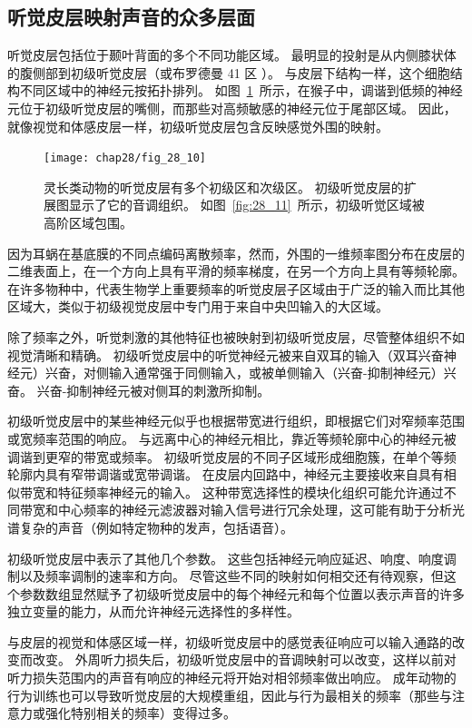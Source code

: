 \subsection{听觉皮层映射声音的众多层面}

听觉皮层包括位于颞叶背面的多个不同功能区域。
最明显的投射是从内侧膝状体的腹侧部到初级听觉皮层（或布罗德曼 41 区 ）。
与皮层下结构一样，这个细胞结构不同区域中的神经元按拓扑排列。
如图~\ref{fig:28_10}~所示，在猴子中，调谐到低频的神经元位于初级听觉皮层的嘴侧，而那些对高频敏感的神经元位于尾部区域。
因此，就像视觉和体感皮层一样，初级听觉皮层包含反映感觉外围的映射。


\begin{figure}[htbp]
	\centering
	\texttt{[image: chap28/fig\_28\_10]}
	\caption{灵长类动物的听觉皮层有多个初级区和次级区。 
		初级听觉皮层的扩展图显示了它的音调组织。
		如图~\ref{fig:28_11}~所示，初级听觉区域被高阶区域包围。}
	\label{fig:28_10}
\end{figure}


因为耳蜗在基底膜的不同点编码离散频率，然而，外围的一维频率图分布在皮层的二维表面上，在一个方向上具有平滑的频率梯度，在另一个方向上具有等频轮廓。
在许多物种中，代表生物学上重要频率的听觉皮层子区域由于广泛的输入而比其他区域大，类似于初级视觉皮层中专门用于来自中央凹输入的大区域。


除了频率之外，听觉刺激的其他特征也被映射到初级听觉皮层，尽管整体组织不如视觉清晰和精确。
初级听觉皮层中的听觉神经元被来自双耳的输入（双耳兴奋神经元）兴奋，对侧输入通常强于同侧输入，或被单侧输入（兴奋-抑制神经元）兴奋。
兴奋-抑制神经元被对侧耳的刺激所抑制。


初级听觉皮层中的某些神经元似乎也根据带宽进行组织，即根据它们对窄频率范围或宽频率范围的响应。
与远离中心的神经元相比，靠近等频轮廓中心的神经元被调谐到更窄的带宽或频率。
初级听觉皮层的不同子区域形成细胞簇，在单个等频轮廓内具有窄带调谐或宽带调谐。
在皮层内回路中，神经元主要接收来自具有相似带宽和特征频率神经元的输入。
这种带宽选择性的模块化组织可能允许通过不同带宽和中心频率的神经元滤波器对输入信号进行冗余处理，这可能有助于分析光谱复杂的声音（例如特定物种的发声，包括语音）。


初级听觉皮层中表示了其他几个参数。
这些包括神经元响应延迟、响度、响度调制以及频率调制的速率和方向。
尽管这些不同的映射如何相交还有待观察，但这个参数数组显然赋予了初级听觉皮层中的每个神经元和每个位置以表示声音的许多独立变量的能力，从而允许神经元选择性的多样性。


与皮层的视觉和体感区域一样，初级听觉皮层中的感觉表征响应可以输入通路的改变而改变。
外周听力损失后，初级听觉皮层中的音调映射可以改变，这样以前对听力损失范围内的声音有响应的神经元将开始对相邻频率做出响应。
成年动物的行为训练也可以导致听觉皮层的大规模重组，因此与行为最相关的频率（那些与注意力或强化特别相关的频率）变得过多\cite{zhang2001persistent,merzenich1975representation}。


